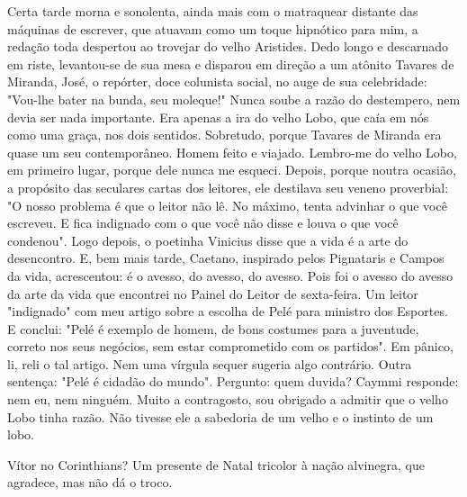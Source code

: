 Certa tarde morna e sonolenta, ainda mais com o matraquear distante das máquinas de escrever, que atuavam como um toque hipnótico para mim, a redação toda despertou ao trovejar do velho Aristides. Dedo longo e descarnado em riste, levantou-se de sua mesa e disparou em direção a um atônito Tavares de Miranda, José, o repórter, doce colunista social, no auge de sua celebridade: "Vou-lhe bater na bunda, seu moleque!" Nunca soube a razão do destempero, nem devia ser nada importante. Era apenas a ira do velho Lobo, que caía em nós como uma graça, nos dois sentidos. Sobretudo, porque Tavares de Miranda era quase um seu contemporâneo. Homem feito e viajado.
Lembro-me do velho Lobo, em primeiro lugar, porque dele nunca me esqueci. Depois, porque noutra ocasião, a propósito das seculares cartas dos leitores, ele destilava seu veneno proverbial: "O nosso problema é que o leitor não lê. No máximo, tenta advinhar o que você escreveu. E fica indignado com o que você não disse e louva o que você condenou".
Logo depois, o poetinha Vinicius disse que a vida é a arte do desencontro. E, bem mais tarde, Caetano, inspirado pelos Pignataris e Campos da vida, acrescentou: é o avesso, do avesso, do avesso.
Pois foi o avesso do avesso da arte da vida que encontrei no Painel do Leitor de sexta-feira. Um leitor "indignado" com meu artigo sobre a escolha de Pelé para ministro dos Esportes. E conclui: "Pelé é exemplo de homem, de bons costumes para a juventude, correto nos seus negócios, sem estar comprometido com os partidos". Em pânico, li, reli o tal artigo. Nem uma vírgula sequer sugeria algo contrário.
Outra sentença: "Pelé é cidadão do mundo". Pergunto: quem duvida? Caymmi responde: nem eu, nem ninguém.
Muito a contragosto, sou obrigado a admitir que o velho Lobo tinha razão. Não tivesse ele a sabedoria de um velho e o instinto de um lobo.
 
Vítor no Corinthians? Um presente de Natal tricolor à nação alvinegra, que agradece, mas não dá o troco.

